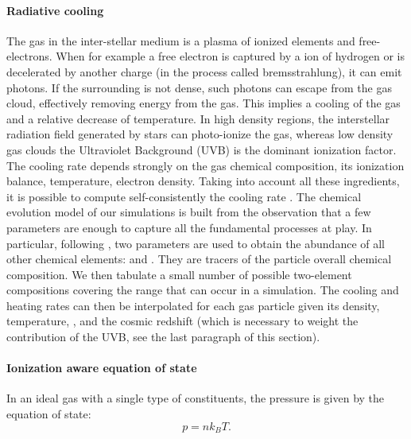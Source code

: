 \paragraph{Radiative cooling}
The gas in the inter-stellar medium is a plasma of ionized elements and free-electrons.
When for example a free electron is captured by a ion of hydrogen or is decelerated by another charge (in the process called bremsstrahlung), it can emit photons.
If the surrounding is not dense, such photons can escape from the gas cloud, effectively removing energy from the gas.
This implies a cooling of the gas and a relative decrease of temperature.
In high density regions, the interstellar radiation field generated by stars can photo-ionize the gas, whereas low density  gas clouds the Ultraviolet Background (UVB) is the dominant ionization factor.
The cooling rate depends strongly on the gas chemical composition, its ionization balance, temperature, electron density.
Taking into account all these ingredients, it is possible to compute self-consistently the cooling rate \citep{Maio2007}.
The chemical evolution model of our simulations is built from the observation that a few parameters are enough to capture all the fundamental processes at play.
In particular, following \citet{DeRijcke2013}, two parameters are used to obtain the abundance of all other chemical elements: \mgfe{} and \feh{}.
They are tracers of the particle overall chemical composition.
We then tabulate a small number of possible two-element compositions covering the range that can occur in a simulation.
The cooling and heating rates can then be interpolated for each gas particle given its density, temperature, \mgfe{}, \feh{} and the cosmic redshift (which is necessary to weight the contribution of the UVB, see the last paragraph of this section).

\paragraph{Ionization aware equation of state}
In an ideal gas with a single type of constituents, the pressure is given by the equation of state:
\begin{equation}
p = n k_B T.
\end{equation}

